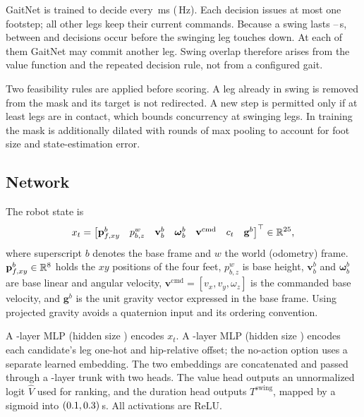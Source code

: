 GaitNet is trained to decide every \corlControlTickMs\,ms
(\corlControlHz\,Hz). Each decision issues at most one footstep; all
other legs keep their current commands. Because a swing lasts
\corlSwingDurationMin--\corlSwingDurationMax\,s, between
\numberstringnum{\corlMinTicksPerSwing} and
\numberstringnum{\corlMaxTicksPerSwing} decisions occur before the
swinging leg touches down. At each of them GaitNet may commit another
leg. Swing overlap therefore arises from the value function and the
repeated decision rule, not from a configured gait.

Two feasibility rules are applied before scoring. A leg already in
swing is removed from the mask and its target is not redirected. A new
step is permitted only if at least
\numberstringnum{\corlMinContactLegs} legs are in contact, which
bounds concurrency at \numberstringnum{\corlMaxConcurrentSwingLegs}
swinging legs. In training the mask is additionally dilated with
\numberstringnum{\corlMaskDilationRounds} rounds of max pooling to
account for foot size and state-estimation error.

\subsection{Network}
\label{subsec:method-network}

The robot state is
\begin{equation}
  x_t =
  \begin{bmatrix}
    \mathbf p_{f,xy}^{b} &
    p_{b,z}^{w} &
    \mathbf v_b^{b} &
    \boldsymbol\omega_b^{b} &
    \mathbf v^{\mathrm{cmd}} &
    c_t &
    \mathbf g^{b}
  \end{bmatrix}^\top \in \mathbb R^{25},
  \label{eq:state}
\end{equation}
where superscript $b$ denotes the base frame and $w$ the world
(odometry) frame. $\mathbf p_{f,xy}^{b}\in\mathbb R^{8}$
holds the $xy$ positions of the four feet, $p_{b,z}^{w}$ is base
height, $\mathbf v_b^{b}$ and $\boldsymbol\omega_b^{b}$ are base linear
and angular velocity, $\mathbf v^{\mathrm{cmd}}=[v_x,v_y,\omega_z]$ is
the commanded base velocity, and $\mathbf g^{b}$ is the unit gravity
vector expressed in the base frame. Using projected gravity avoids a
quaternion input and its ordering convention.

A \numberstringnum{\corlStateEncoderLayers}-layer MLP (hidden size
\corlStateEncoderHidden) encodes $x_t$. A
\numberstringnum{\corlFootstepEncoderLayers}-layer MLP (hidden size
\corlFootstepEncoderHidden) encodes each candidate's leg one-hot and
hip-relative offset; the no-action option uses a separate learned
embedding. The two embeddings are concatenated
\cite{feng2021deep} and passed through a
\numberstringnum{\corlTrunkLayers}-layer trunk with two heads. The
value head outputs an unnormalized logit $\hat V$ used for ranking,
and the duration head outputs $T^{\mathrm{swing}}$, mapped by a sigmoid
into $(0.1,0.3)$\,s. All
activations are ReLU.

